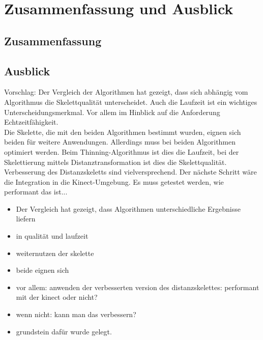 \chapter{Zusammenfassung und Ausblick}
\section{Zusammenfassung}
\section{Ausblick}
Vorschlag: Der Vergleich der Algorithmen hat gezeigt, dass sich abhängig vom Algorithmus die Skelettqualität unterscheidet. Auch die 
Laufzeit ist ein wichtiges Unterscheidungsmerkmal. Vor allem im Hinblick auf die Anforderung Echtzeitfähigkeit.\\
Die Skelette, die mit den beiden Algorithmen bestimmt wurden, eignen sich beiden für weitere Anwendungen. Allerdings muss bei beiden Algorithmen optimiert werden. Beim Thinning-Algorithmus ist dies die Laufzeit, bei der Skelettierung mittels Distanztransformation ist dies die Skelettqualität. Verbesserung des Distanzskeletts sind vielversprechend. Der nächste Schritt wäre die Integration in die Kinect-Umgebung. Es muss
getestet werden, wie performant das ist...\\
\begin{itemize}
\item Der Vergleich hat gezeigt, dass Algorithmen unterschiedliche Ergebnisse liefern
\item in qualität und laufzeit
\item weiternutzen der skelette
\item beide eignen sich
\item vor allem: anwenden der verbesserten version des distanzskelettes: performant mit der kinect oder nicht?
\item wenn nicht: kann man das verbessern?
\item grundstein dafür wurde gelegt. 
\end{itemize}
